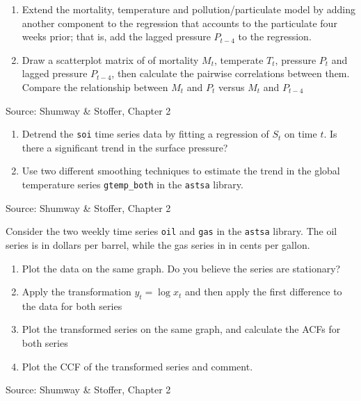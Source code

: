 \begin{withcode}
\begin{exerciseboxcomputer}
\begin{enumerate}
  \item Extend the mortality, temperature and pollution/particulate model by adding another component to the regression that accounts to the particulate four weeks prior; that is, add the lagged pressure $P_{t-4}$ to the regression.
  \item Draw a scatterplot matrix of of mortality $M_t$, temperate $T_t$, pressure $P_t$ and lagged pressure $P_{t-4}$, then calculate the pairwise correlations between them. Compare the relationship between $M_t$ and $P_t$ versus $M_t$ and $P_{t-4}$
\end{enumerate}

{\footnotesize \vspace{\baselineskip} Source: Shumway \& Stoffer, Chapter 2}
\end{exerciseboxcomputer}

\begin{exerciseboxcomputer}

\begin{enumerate}
  \item Detrend the \texttt{soi} time series data by fitting a regression of $S_t$ on time $t$. Is there a significant trend in the surface pressure?
  \item Use two different smoothing techniques to estimate the trend in the global temperature series \texttt{gtemp\_both} in the \texttt{astsa} library.
\end{enumerate}

{\footnotesize \vspace{\baselineskip} Source: Shumway \& Stoffer, Chapter 2}
\end{exerciseboxcomputer}

\begin{exerciseboxcomputer}

Consider the two weekly time series \texttt{oil} and \texttt{gas} in the  \texttt{astsa} library. The oil series is in dollars per barrel, while the gas series in in cents per gallon.
\begin{enumerate}
   \item Plot the data on the same graph. Do you believe the series are stationary?
   \item Apply the transformation $y_t = \log x_t$ and then apply the first difference to the data for both series
   \item Plot the transformed series on the same graph, and calculate the ACFs for both series
   \item Plot the CCF of the transformed series and comment.
\end{enumerate}

{\footnotesize \vspace{\baselineskip} Source: Shumway \& Stoffer, Chapter 2}
\end{exerciseboxcomputer}
\end{withcode}

